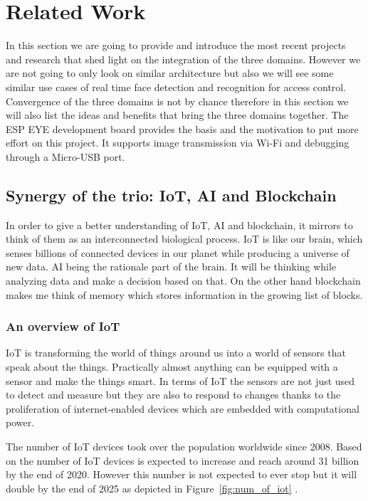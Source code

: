 \chapter{Related Work}
\label{chap:related_work}

In this section we are going to provide and introduce the most recent projects and research that shed light on the integration of the three domains. However we are not going to only look on similar architecture but also we will see some similar use cases of real time face detection and recognition for access control. Convergence of the three domains is not by chance therefore in this section we will also list the ideas and benefits that bring the three domains together. 
The ESP EYE development board  provides the basis and the motivation to put more effort on this project. It supports image transmission via Wi-Fi and debugging through a Micro-USB port. 

\section{Synergy of the trio: IoT, AI and Blockchain }

In order to give a better understanding of IoT, AI and blockchain, it mirrors to think of them as an interconnected biological process. IoT is like our brain, which senses billions of connected devices in our planet while producing a universe of new data. AI being the rationale part of the brain. It will be thinking while analyzing data and make a decision based on that. On the other hand blockchain makes me think of memory which stores information in the growing list of blocks.
\subsection{An overview of IoT}

IoT is transforming the world of things around us into a world of sensors that speak about the things. Practically almost anything can be equipped with a sensor and make the things smart. In terms of IoT the sensors are not just used to detect and measure but they are also to respond to changes thanks to the proliferation of internet-enabled devices which are embedded with computational power. 

The number of IoT devices took over the population worldwide since 2008. Based on \cite{ITU} the number of IoT devices is expected to increase and reach around 31 billion by the end of 2020. However this number is not expected to ever stop but it will double by the end of 2025 \cite{soton421529} as depicted in Figure~\ref{fig:num_of_iot} .

